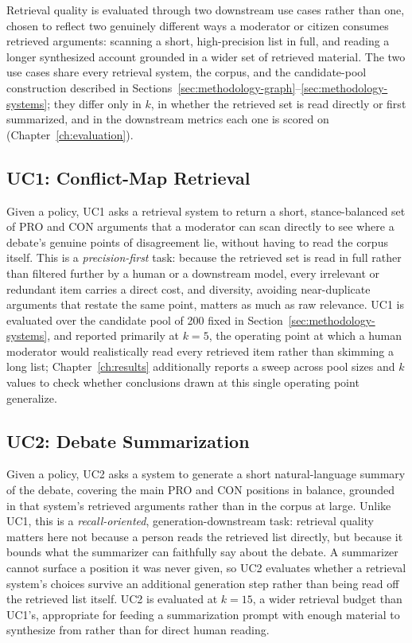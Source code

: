 Retrieval quality is evaluated through two downstream use cases rather than one, chosen to
reflect two genuinely different ways a moderator or citizen consumes retrieved arguments: scanning
a short, high-precision list in full, and reading a longer synthesized account grounded in a wider
set of retrieved material. The two use cases share every retrieval system, the corpus, and the
candidate-pool construction described in Sections~\ref{sec:methodology-graph}--\ref{sec:methodology-systems};
they differ only in $k$, in whether the retrieved set is read directly or first summarized, and in
the downstream metrics each one is scored on (Chapter~\ref{ch:evaluation}).

\subsection{UC1: Conflict-Map Retrieval}
\label{sec:methodology-uc1}

Given a policy, UC1 asks a retrieval system to return a short, stance-balanced set of PRO and CON
arguments that a moderator can scan directly to see where a debate's genuine points of
disagreement lie, without having to read the corpus itself. This is a \emph{precision-first} task:
because the retrieved set is read in full rather than filtered further by a human or a downstream
model, every irrelevant or redundant item carries a direct cost, and diversity, avoiding
near-duplicate arguments that restate the same point, matters as much as raw relevance. UC1 is
evaluated over the candidate pool of 200 fixed in Section~\ref{sec:methodology-systems}, and
reported primarily at $k=5$, the operating point at which a human moderator would realistically
read every retrieved item rather than skimming a long list; Chapter~\ref{ch:results} additionally
reports a sweep across pool sizes and $k$ values to check whether conclusions drawn at this single
operating point generalize.

\subsection{UC2: Debate Summarization}
\label{sec:methodology-uc2}

Given a policy, UC2 asks a system to generate a short natural-language summary of the debate,
covering the main PRO and CON positions in balance, grounded in that system's retrieved arguments
rather than in the corpus at large. Unlike UC1, this is a \emph{recall-oriented},
generation-downstream task: retrieval quality matters here not because a person reads the
retrieved list directly, but because it bounds what the summarizer can faithfully say about the
debate. A summarizer cannot surface a position it was never given, so UC2 evaluates whether a
retrieval system's choices survive an additional generation step rather than being read off the
retrieved list itself. UC2 is evaluated at $k=15$, a wider retrieval budget than UC1's, appropriate
for feeding a summarization prompt with enough material to synthesize from rather than for direct
human reading.

